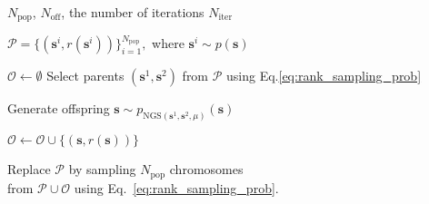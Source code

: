 


\begin{algorithmic}[1]
    \REQUIRE $N_{\text{pop}}$, $N_{\text{off}}$, the number of iterations $N_{\text{iter}}$ %
    
    \STATE $\mathcal{P}=\{ (\mathbf{s}^i, r(\mathbf{s}^i)) \}_{i=1}^{N_{\text{pop}}},$ where $\mathbf{s}^i \sim p(\mathbf{s}) \qquad$ 

    
    \STATE $\mathcal{O} \gets \emptyset$
    \STATE Select parents $(\mathbf{s}^{1}, \mathbf{s}^{2})$ from $\mathcal{P}$ using Eq.\eqref{eq:rank_sampling_prob} 

    \STATE Generate offspring $\mathbf{s} \sim p_{\text{NGS}(\mathbf{s}^{1}, \mathbf{s}^{2}, \mu)}(\mathbf{s})$ 

    \STATE $\mathcal{O} \gets \mathcal{O} \cup \{(\mathbf{s}, r(\mathbf{s}) )\}$

    \ENDFOR
    
    \STATE Replace $\mathcal{P}$ by sampling $N_{\text{pop}}$ chromosomes \\ from $\mathcal{P} \cup \mathcal{O}$ using Eq.~\eqref{eq:rank_sampling_prob}.

    \ENDFOR

\end{algorithmic}
